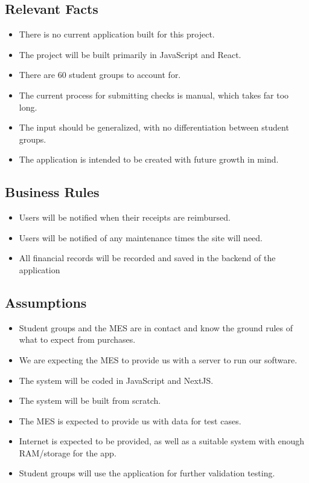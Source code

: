 \documentclass[12pt]{article}
\begin{document}
\subsection{Relevant Facts}
\begin{itemize}
  \item There is no current application built for this project.
  \item The project will be built primarily in JavaScript and React.
  \item There are 60 student groups to account for.
  \item The current process for submitting checks is manual, which takes far too long.
  \item The input should be generalized, with no differentiation between student groups.
  \item The application is intended to be created with future growth in mind.
\end{itemize}



\subsection{Business Rules}
\begin{itemize}
  \item Users will be notified when their receipts are reimbursed.
  \item Users will be notified of any maintenance times the site will need.
  \item All financial records will be recorded and saved in the backend of the application 
\end{itemize}

\subsection{Assumptions}
\begin{itemize}
  \item Student groups and the MES are in contact and know the ground rules of what to expect from purchases.
  \item We are expecting the MES to provide us with a server to run our software.
  \item The system will be coded in JavaScript and NextJS.
  \item The system will be built from scratch.
  \item The MES is expected to provide us with data for test cases.
  \item Internet is expected to be provided, as well as a suitable system with enough RAM/storage for the app. 
  \item Student groups will use the application for further validation testing. 
\end{itemize}
\end{document}
